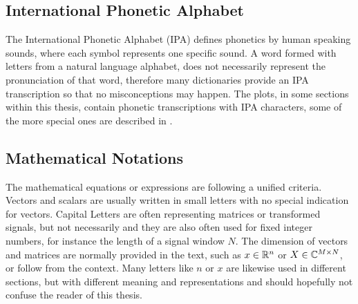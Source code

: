 
\subsection{International Phonetic Alphabet}\label{sec:intro_overview_ipa}
The International Phonetic Alphabet (IPA) defines phonetics by human speaking sounds, where each symbol represents one specific sound.
A word formed with letters from a natural language alphabet, does not necessarily represent the pronunciation of that word, therefore many dictionaries provide an IPA transcription so that no misconceptions may happen.
The plots, in some sections within this thesis, contain phonetic transcriptions with IPA characters, some of the more special ones are described in .



\subsection{Mathematical Notations}\label{sec:intro_overview_math}
The mathematical equations or expressions are following a unified criteria.
Vectors and scalars are usually written in small letters with no special indication for vectors.
Capital Letters are often representing matrices or transformed signals, but not necessarily and they are also often used for fixed integer numbers, for instance the length of a signal window $N$.
The dimension of vectors and matrices are normally provided in the text, such as $x\in\mathbb{R}^n$ or $X\in\mathbb{C}^{M \times N}$, or follow from the context.
Many letters like $n$ or $x$ are likewise used in different sections, but with different meaning and representations and should hopefully not confuse the reader of this thesis.

